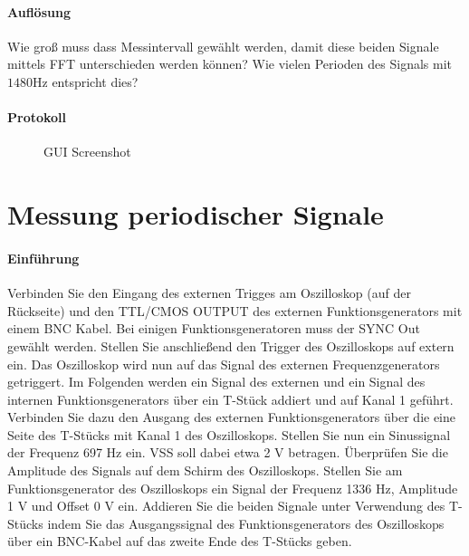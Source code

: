 \documentclass[10pt]{report}
\begin{document}
        \paragraph{Auflösung}
        Wie groß muss dass Messintervall gewählt werden, damit diese beiden Signale
        mittels FFT unterschieden werden können? Wie vielen Perioden des Signals mit
        $1480\si{\hertz}$ entspricht dies?
        \paragraph{Protokoll}
        \begin{center}
            \begin{figure}[H]
              \caption{GUI Screenshot}
            \end{figure}
        \end{center}


        \section{Messung periodischer Signale}
        \paragraph{Einführung}
        Verbinden Sie den Eingang des externen Trigges am Oszilloskop (auf der Rückseite) und
        den \glqq{}TTL/CMOS OUTPUT\grqq{} des externen Funktionsgenerators mit einem BNC Kabel.
        Bei einigen Funktionsgeneratoren muss der \glqq{}SYNC Out\grqq{} gewählt werden. Stellen Sie
        anschließend den Trigger des Oszilloskops auf \glqq{}extern\grqq{} ein. Das Oszilloskop wird nun auf
        das Signal des externen Frequenzgenerators getriggert.
        Im Folgenden werden ein Signal des externen und ein Signal des internen Funktionsgenerators
        über ein T-Stück addiert und auf Kanal 1 geführt.
        Verbinden Sie dazu den Ausgang des externen Funktionsgenerators über die eine Seite
        des T-Stücks mit Kanal 1 des Oszilloskops. Stellen Sie nun ein Sinussignal der Frequenz
        697 Hz ein. VSS soll dabei etwa 2 V betragen. Überprüfen Sie die Amplitude des Signals
        auf dem Schirm des Oszilloskops.
        Stellen Sie am Funktionsgenerator des Oszilloskops ein Signal der Frequenz 1336 Hz,
        Amplitude 1 V und Offset 0 V ein. Addieren Sie die beiden Signale unter Verwendung des
        T-Stücks indem Sie das Ausgangssignal des Funktionsgenerators des Oszilloskops über
        ein BNC-Kabel auf das zweite Ende des T-Stücks geben.
\end{document}
